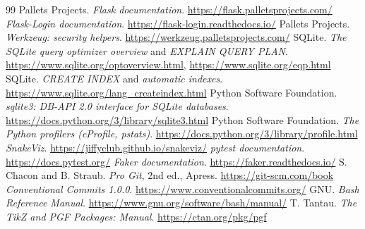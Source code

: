 \documentclass[11pt,a4paper]{article}
\begin{document}
\begin{thebibliography}{99}
 Pallets Projects. \emph{Flask documentation}. \url{https://flask.palletsprojects.com/}
 \emph{Flask-Login documentation}. \url{https://flask-login.readthedocs.io/}
 Pallets Projects. \emph{Werkzeug: security helpers}. \url{https://werkzeug.palletsprojects.com/}
 SQLite. \emph{The SQLite query optimizer overview} and \emph{EXPLAIN QUERY PLAN}. \url{https://www.sqlite.org/optoverview.html}, \url{https://www.sqlite.org/eqp.html}
 SQLite. \emph{CREATE INDEX} and \emph{automatic indexes}. \url{https://www.sqlite.org/lang_createindex.html}
 Python Software Foundation. \emph{sqlite3: DB-API 2.0 interface for SQLite databases}. \url{https://docs.python.org/3/library/sqlite3.html}
 Python Software Foundation. \emph{The Python profilers (cProfile, pstats)}. \url{https://docs.python.org/3/library/profile.html}
 \emph{SnakeViz}. \url{https://jiffyclub.github.io/snakeviz/}
 \emph{pytest documentation}. \url{https://docs.pytest.org/}
 \emph{Faker documentation}. \url{https://faker.readthedocs.io/}
 S. Chacon and B. Straub. \emph{Pro Git}, 2nd ed., Apress. \url{https://git-scm.com/book}
 \emph{Conventional Commits 1.0.0}. \url{https://www.conventionalcommits.org/}
 GNU. \emph{Bash Reference Manual}. \url{https://www.gnu.org/software/bash/manual/}
 T. Tantau. \emph{The TikZ and PGF Packages: Manual}. \url{https://ctan.org/pkg/pgf}
\end{thebibliography}
\end{document}
